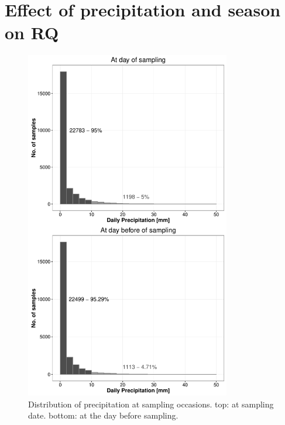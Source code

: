 \documentclass[pdftex,a4paper]{scrreprt}
\begin{document}
\chapter{Effect of precipitation and season on RQ}
\begin{figure}[ht]
	\centering
	\includegraphics[width = 0.8\textwidth]{precip}
	\caption[Distribution of precipitation at sampling occasions.]{Distribution of precipitation at sampling occasions. top: at sampling date. bottom: at the day before sampling.}
	\label{fig:precip}
\end{figure}

\newpage

\newpage

\end{document}
